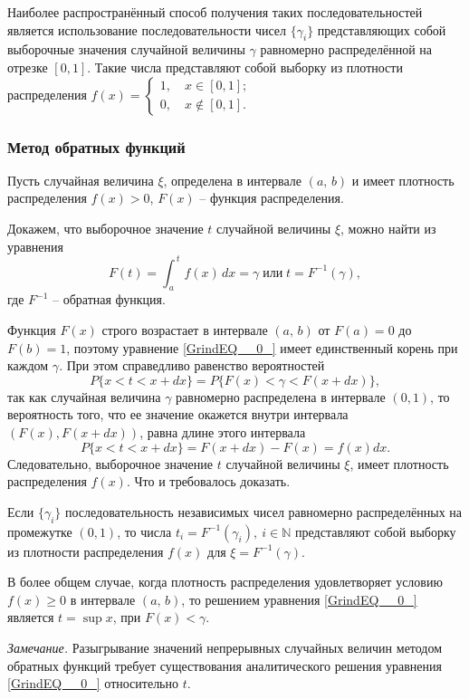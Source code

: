 \documentclass[
11pt,
master, %
subf, %
href, %
colorlinks=true, %
]{disser}
\begin{document}
Наиболее распространённый способ получения таких последовательностей является использование последовательности чисел $\{\gamma_i\}$ представляющих собой выборочные значения случайной величины $\gamma $ равномерно распределённой на отрезке $[0,1]$. Такие числа представляют собой выборку из плотности распределения
$f(x)=\left\{\begin{array}{l} {1,\quad x\in [0,1];} \\ {0,\quad x\notin [0,1].} \end{array}\right. $

\subsubsection{Метод обратных функций}

Пусть случайная величина $\xi $, определена в интервале $(a,\, b)$ и имеет плотность распределения $f(x)>0$, $F(x)$ -- функция распределения.

Докажем, что выборочное значение $t$ случайной величины $\xi $, можно найти из уравнения
\begin{equation}\label{GrindEQ__0_}
  F(t)=\int _{\, a}^{\, t}f(x)\,  dx=\gamma\; \text{или}\;t=F^{-1} (\gamma ),
\end{equation}
где $F^{-1} $ -- обратная  функция.

Функция $F(x)$ строго возрастает в интервале $(a,\, b)$ от $F(a)=0$ до $F(b)=1$, поэтому уравнение \eqref{GrindEQ__0_} имеет единственный корень при каждом $\gamma $. При этом справедливо равенство вероятностей
\[P\{ x<t<x+dx\} =P\{ F(x)<\gamma <F(x+dx)\} ,\]
так как случайная величина $\gamma $ равномерно распределена в интервале $(0,1)$, то вероятность того, что ее значение окажется внутри интервала  $(F(x),F(x+dx))$, равна длине этого интервала
\[P\{ x<t<x+dx\} =F(x+dx)-F(x)=f(x)dx.\]
Следовательно, выборочное значение $t$ случайной величины $\xi $, имеет плотность распределения $f(x)$. Что и требовалось доказать.

Если $\{\gamma_i \}$ последовательность независимых чисел равномерно распределённых на промежутке $(0,1)$, то числа $t_{i} =F^{-1} (\gamma _{i} ), ~ i \in \mathbb{N}$ представляют собой выборку  из плотности распределения $f(x)$ для  $\xi =F^{-1} (\gamma )$.


В более общем случае, когда плотность распределения удовлетворяет условию $f(x)\ge 0$ в интервале $(a,\, b)$, то решением уравнения \eqref{GrindEQ__0_} является $t=\sup x$, при $F(x)<\gamma $.

\textit{Замечание.} Разыгрывание значений непрерывных случайных величин методом обратных функций требует существования аналитического решения уравнения \eqref{GrindEQ__0_} относительно $t$.
\end{document}
